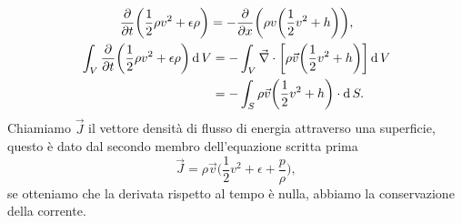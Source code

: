 \begin{gather*}
    \frac{\partial}{\partial t}\biggl( \frac{1}{2}\rho v^2 + \epsilon \rho \biggr) = - \frac{\partial}{\partial x}\biggl( \rho v \biggl( \frac{1}{2} v^2 + h \biggr) \biggr), \\
    \begin{align}
        \int_V \frac{\partial}{\partial t}\biggl( \frac{1}{2}\rho v^2 + \epsilon \rho \biggr) \operatorname{d} V & = - \int_V \vec{\nabla} \cdot \biggl[ \rho \vec{v} \biggl( \frac{1}{2} v^2 + h \biggr) \biggr] \operatorname{d} V\\
                                                                                                     & = - \int_S \rho \vec{v} \biggl( \frac{1}{2} v^2 + h \biggr) \cdot \operatorname{d} S.
    \end{align}
\end{gather*}
Chiamiamo $\vec{J}$ il vettore densità di flusso di energia attraverso una superficie, questo è dato dal secondo membro dell'equazione scritta prima
\begin{equation*}
    \vec{J} = \rho \vec{v} \biggl( \frac{1}{2} v^2 + \epsilon + \frac{p}{\rho} \biggr),
\end{equation*}
se otteniamo che la derivata rispetto al tempo è nulla, abbiamo la conservazione della corrente.

